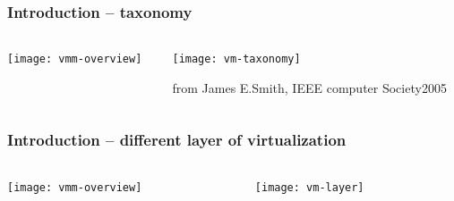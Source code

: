 \begin{frame}[plain]
	\frametitle{Introduction -- taxonomy}



	\begin{columns}

	\begin{column}{.3\textwidth}
	
	\texttt{[image: vmm-overview]}
	
	\end{column}

	\begin{column}{.7\textwidth}
	

	\texttt{[image: vm-taxonomy]}
	
	\tiny	
	from James E.Smith,     IEEE computer Society2005	
	\end{column}
	
    
\end{columns}


\end{frame}

\begin{frame}[plain]
	\frametitle{Introduction -- different layer of virtualization}
	
	
	
	\begin{columns}
		
		\begin{column}{.3\textwidth}
			
			\texttt{[image: vmm-overview]}
			
		\end{column}
		
		\begin{column}{.5\textwidth}
			
			
			\texttt{[image: vm-layer]}
			
			
		\end{column}
		
		
	\end{columns}
	
	
\end{frame}


